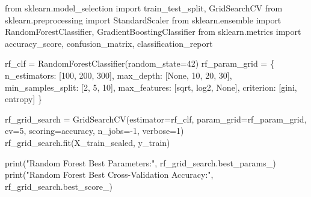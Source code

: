 \documentclass[
  11pt,
  letterpaper,
  DIV=11,
  numbers=noendperiod]{scrartcl}
\newenvironment{Shaded}{\begin{snugshade}}{\end{snugshade}}
\newcommand{\BuiltInTok}[1]{\textcolor[rgb]{0.00,0.23,0.31}{#1}}
\newcommand{\DecValTok}[1]{\textcolor[rgb]{0.68,0.00,0.00}{#1}}
\newcommand{\ImportTok}[1]{\textcolor[rgb]{0.00,0.46,0.62}{#1}}
\newcommand{\NormalTok}[1]{\textcolor[rgb]{0.00,0.23,0.31}{#1}}
\newcommand{\OperatorTok}[1]{\textcolor[rgb]{0.37,0.37,0.37}{#1}}
\newcommand{\StringTok}[1]{\textcolor[rgb]{0.13,0.47,0.30}{#1}}
\newcommand{\VariableTok}[1]{\textcolor[rgb]{0.07,0.07,0.07}{#1}}
\begin{document}
\begin{Shaded}
\begin{Highlighting}[]
\ImportTok{from}\NormalTok{ sklearn.model\_selection }\ImportTok{import}\NormalTok{ train\_test\_split, GridSearchCV}
\ImportTok{from}\NormalTok{ sklearn.preprocessing }\ImportTok{import}\NormalTok{ StandardScaler}
\ImportTok{from}\NormalTok{ sklearn.ensemble }\ImportTok{import}\NormalTok{ RandomForestClassifier, GradientBoostingClassifier}
\ImportTok{from}\NormalTok{ sklearn.metrics }\ImportTok{import}\NormalTok{ accuracy\_score, confusion\_matrix, classification\_report}


\NormalTok{rf\_clf }\OperatorTok{=}\NormalTok{ RandomForestClassifier(random\_state}\OperatorTok{=}\DecValTok{42}\NormalTok{)}
\NormalTok{rf\_param\_grid }\OperatorTok{=}\NormalTok{ \{}
    \StringTok{\textquotesingle{}n\_estimators\textquotesingle{}}\NormalTok{: [}\DecValTok{100}\NormalTok{, }\DecValTok{200}\NormalTok{, }\DecValTok{300}\NormalTok{],}
    \StringTok{\textquotesingle{}max\_depth\textquotesingle{}}\NormalTok{: [}\VariableTok{None}\NormalTok{, }\DecValTok{10}\NormalTok{, }\DecValTok{20}\NormalTok{, }\DecValTok{30}\NormalTok{],}
    \StringTok{\textquotesingle{}min\_samples\_split\textquotesingle{}}\NormalTok{: [}\DecValTok{2}\NormalTok{, }\DecValTok{5}\NormalTok{, }\DecValTok{10}\NormalTok{],}
    \StringTok{\textquotesingle{}max\_features\textquotesingle{}}\NormalTok{: [}\StringTok{\textquotesingle{}sqrt\textquotesingle{}}\NormalTok{, }\StringTok{\textquotesingle{}log2\textquotesingle{}}\NormalTok{, }\VariableTok{None}\NormalTok{],}
    \StringTok{\textquotesingle{}criterion\textquotesingle{}}\NormalTok{: [}\StringTok{\textquotesingle{}gini\textquotesingle{}}\NormalTok{, }\StringTok{\textquotesingle{}entropy\textquotesingle{}}\NormalTok{]}
\NormalTok{\}}

\NormalTok{rf\_grid\_search }\OperatorTok{=}\NormalTok{ GridSearchCV(estimator}\OperatorTok{=}\NormalTok{rf\_clf, param\_grid}\OperatorTok{=}\NormalTok{rf\_param\_grid, cv}\OperatorTok{=}\DecValTok{5}\NormalTok{, scoring}\OperatorTok{=}\StringTok{\textquotesingle{}accuracy\textquotesingle{}}\NormalTok{, n\_jobs}\OperatorTok{={-}}\DecValTok{1}\NormalTok{, verbose}\OperatorTok{=}\DecValTok{1}\NormalTok{)}
\NormalTok{rf\_grid\_search.fit(X\_train\_scaled, y\_train)}

\BuiltInTok{print}\NormalTok{(}\StringTok{"Random Forest Best Parameters:"}\NormalTok{, rf\_grid\_search.best\_params\_)}
\BuiltInTok{print}\NormalTok{(}\StringTok{"Random Forest Best Cross{-}Validation Accuracy:"}\NormalTok{, rf\_grid\_search.best\_score\_)}


\end{Highlighting}
\end{Shaded}
\end{document}
